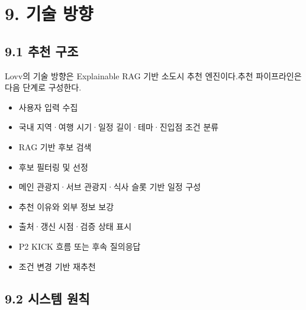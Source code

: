 \documentclass[12pt,a4paper]{article}
\newcommand{\DocNeedspace}[1]{\par\ifdim\dimexpr\pagegoal-\pagetotal\relax<#1\newpage\fi}
\begin{document}
\newpage

\DocNeedspace{10\baselineskip}
\section*{9. 기술 방향}


\DocNeedspace{8\baselineskip}
\subsection*{9.1 추천 구조}


\DocNeedspace{3\baselineskip}
Lovv의 기술 방향은 Explainable RAG 기반 소도시 추천 엔진이다.\newline 추천 파이프라인은 다음 단계로 구성한다.


\begin{itemize}
\item 사용자 입력 수집
\item 국내 지역·여행 시기·일정 길이·테마·진입점 조건 분류
\item RAG 기반 후보 검색
\item 후보 필터링 및 선정
\item 메인 관광지·서브 관광지·식사 슬롯 기반 일정 구성
\item 추천 이유와 외부 정보 보강
\item 출처·갱신 시점·검증 상태 표시
\item P2 KICK 흐름 또는 후속 질의응답
\item 조건 변경 기반 재추천
\end{itemize}


\DocNeedspace{24\baselineskip}
\subsection*{9.2 시스템 원칙}
\end{document}
